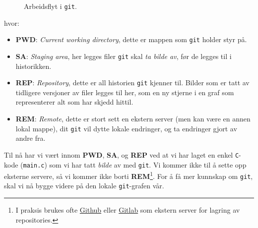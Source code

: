 \begin{alphasection}
\begin{figure}[ht]
    \caption{Arbeidsflyt i \texttt{git}.}
    \label{fig:2-oppgaveish}
\end{figure}
\newpage
hvor:

\begin{itemize}
    \item \textbf{PWD}: \textit{Current working directory}, dette er mappen som \verb|git| holder styr på.
    \item \textbf{SA}: \textit{Staging area}, her legges filer \verb|git| skal \textit{ta bilde av}, før de legges til i historikken.
    \item \textbf{REP}: \textit{Repository}, dette er all historien \verb|git| kjenner til. Bilder som er tatt av tidligere versjoner av filer legges til her, som en ny stjerne i en graf
    som representerer alt som har skjedd hittil.
    
    \item \textbf{REM}: \textit{Remote}, dette er stort sett en ekstern server (men kan være en annen
    lokal mappe), dit \verb|git| vil dytte lokale endringer, og ta endringer gjort
    av andre fra. 
\end{itemize}



Til nå har vi vært innom \textbf{PWD}, \textbf{SA}, og \textbf{REP} ved at vi har laget en enkel \verb|C|-kode (\verb|main.c|) som vi har tatt \textit{bilde} av med \verb|git|. Vi kommer ikke til å sette opp eksterne servere, så vi kommer ikke borti \textbf{REM}\footnote{I praksis brukes ofte \href{https://github.com}{Github} eller \href{https://gitlab.com}{Gitlab} som ekstern server for lagring av repositories.}. For å få mer kunnskap om \verb|git|, skal vi nå bygge videre på den lokale \verb|git|-grafen vår.


\end{alphasection}
